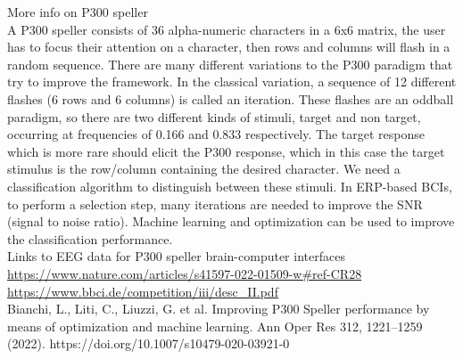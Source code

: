 \documentclass{article}
\begin{document}
More info on P300 speller\\
A P300 speller consists of 36 alpha-numeric characters in a 6x6 matrix, the user has to focus their attention on a character, then rows and columns will flash in a random sequence. There are many different variations to the P300 paradigm that try to improve the framework. In the classical variation, a sequence of 12 different flashes (6 rows and 6 columns) is called an iteration. These flashes are an oddball paradigm, so there are two different kinds of stimuli, target and non target, occurring at frequencies of 0.166 and 0.833 respectively. The target response which is more rare should elicit the P300 response, which in this case the target stimulus is the row/column containing the desired character. We need a classification algorithm to distinguish between these stimuli. In ERP-based BCIs, to perform a selection step, many iterations are needed to improve the SNR (signal to noise ratio). Machine learning and optimization can be used to improve the classification performance.\\

Links to EEG data for P300 speller brain-computer interfaces\\
\url{https://www.nature.com/articles/s41597-022-01509-w#ref-CR28} \\
\url{https://www.bbci.de/competition/iii/desc_II.pdf} \\

Bianchi, L., Liti, C., Liuzzi, G. et al. Improving P300 Speller performance by means of optimization and machine learning. Ann Oper Res 312, 1221–1259 (2022). https://doi.org/10.1007/s10479-020-03921-0
\end{document}
